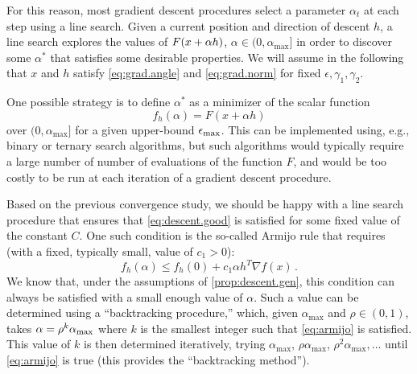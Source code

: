 For this reason, most gradient descent procedures select a parameter $\alpha_t$ at each step using a line search.  Given a current position and direction of descent $h$, a line search explores the values of $F(x + \alpha h)$, $\alpha\in (0, \alpha_{\mathrm{max}}] $ in order to discover some $\alpha^*$ that satisfies some desirable properties. We will assume in the following that $x$ and $h$ satisfy \cref{eq:grad.angle} and \cref{eq:grad.norm} for fixed $\epsilon, \gamma_1, \gamma_2$.

One possible strategy is to define $\alpha^*$ as a minimizer of  the scalar function 
\[
f_h(\alpha) = F(x + \alpha h)
\] 
over $ (0, \alpha_{\mathrm{max}}]$ for a given upper-bound $\epsilon_{\mathrm{max}}$. This can be implemented using, e.g.,  binary or ternary search algorithms, but  such algorithms would typically require a large number of number of evaluations of the function $F$, and would be too costly to be run at each iteration of a gradient descent procedure.  

Based on the previous convergence study, we should be happy with a line search procedure that ensures that \cref{eq:descent.good} is satisfied for some fixed value of the constant $C$. One such condition is the so-called Armijo rule that requires (with a fixed, typically small, value of $c_1>0$):
\begin{equation}
f_h(\alpha) \leq f_h(0) + c_1\alpha h^T\nabla f(x)\,.
\label{eq:armijo}
\end{equation}
We know that, under the assumptions of \cref{prop:descent.gen}, this condition can always be satisfied with a small enough value of $\alpha$. Such a value can be determined using a ``backtracking procedure,''  which, given $\alpha_{\mathrm{max}}$ and $\rho \in (0,1)$, takes $\alpha = \rho^k \alpha_{\mathrm{max}}$ where $k$ is the smallest integer such that \cref{eq:armijo} is satisfied. This value of $k$ is then determined iteratively, trying $\alpha_{\mathrm{max}}$, $\rho\alpha_{\mathrm{max}}$, $\rho^2\alpha_{\mathrm{max}}, \ldots$ until \cref{eq:armijo} is true (this provides the ``backtracking method''). 

